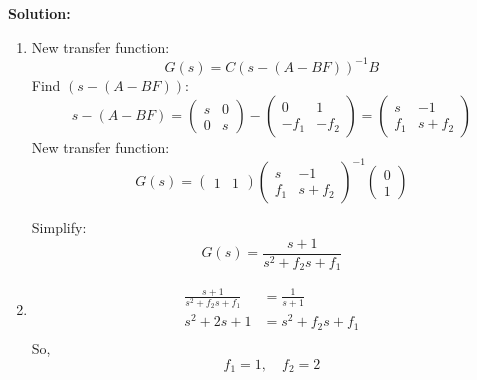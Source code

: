 \documentclass[12pt]{article}
\newenvironment{solution}{
    \textbf{Solution:}
    
}{
    
    \vspace{2em}
}
\begin{document}
\begin{solution}
\begin{enumerate}[label=(\alph*)]
    \item
    New transfer function:
    \[
        G(s) = C(s - (A - BF))^{-1}B
    \]
    Find \( (s - (A - BF)) \):
    \[
        s - (A - BF) = \begin{pmatrix}
            s & 0 \\
            0 & s
        \end{pmatrix} - \begin{pmatrix}
            0 & 1 \\
            -f_1 & -f_2
        \end{pmatrix} = \begin{pmatrix}
            s & -1 \\
            f_1 & s + f_2
        \end{pmatrix}
    \]
    New transfer function:
    \[
        G(s) = \begin{pmatrix}
            1 & 1
        \end{pmatrix}
        \begin{pmatrix}
            s & -1 \\
            f_1 & s + f_2
        \end{pmatrix}^{-1}
        \begin{pmatrix}
            0 \\
            1
        \end{pmatrix}
    \]

    Simplify:
    \[
        G(s) =  \frac{s + 1}{s^2 + f_2s + f_1}
    \]  
    \item 
    \[
        \begin{aligned}
            \frac{s + 1}{s^2 + f_2s + f_1} &= \frac{1}{s + 1} \\
            s^2 + 2s + 1 &= s^2 + f_2s + f_1 \\
        \end{aligned}
    \]
    So,
    \[
        f_1 = 1, \quad f_2 = 2
    \]
    \end{enumerate}
\end{solution}
\end{document}
